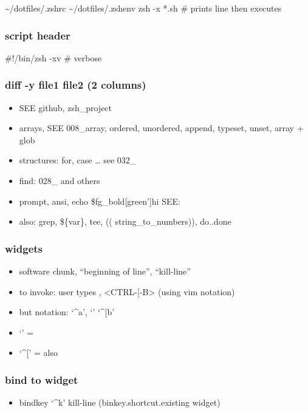 \documentclass[
  letterpaper,
  DIV=11,
  numbers=noendperiod]{scrartcl}
\providecommand{\tightlist}{%
  \setlength{\itemsep}{0pt}\setlength{\parskip}{0pt}}\usepackage{longtable,booktabs,array}
\begin{document}
\textasciitilde/dotfiles/.zshrc \textasciitilde/dotfiles/.zshenv zsh -x
*.sh \# prints line then executes

\subsubsection{script header}\label{script-header}

\#!/bin/zsh -xv \# verbose

\subsubsection{diff -y file1 file2 (2
columns)}\label{diff--y-file1-file2-2-columns}

\begin{itemize}
\tightlist
\item
  SEE github, zsh\_project
\item
  arrays, SEE 008\_array, ordered, unordered, append, typeset, unset,
  array + glob
\item
  structures: for, case \ldots{} see 032\_
\item
  find: 028\_ and others
\item
  prompt, ansi, echo \$fg\_bold{[}green'{]}hi SEE:
\item
  also: grep, \$\{var\}, tee, (( string\_to\_numbers)), do..done
\end{itemize}

\subsubsection{widgets}\label{widgets}

\begin{itemize}
\tightlist
\item
  software chunk, ``beginning of line'', ``kill-line''
\item
  to invoke: user types , \textless CTRL-{[}-B\textgreater{} (using vim
  notation)
\item
  but notation: `\^{}a', `\eb' `\^{}{[}b'
\item
  `\e' =
\item
  `\^{}{[}' = also
\end{itemize}

\subsubsection{bind to widget}\label{bind-to-widget}

\begin{itemize}
\tightlist
\item
  bindkey `\^{}k' kill-line (binkey.shortcut.existing widget)
\end{itemize}
\end{document}
